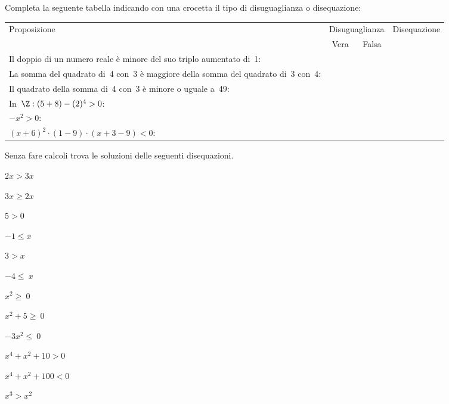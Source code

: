 \begin{esercizio}
 \label{ese:dis_9}
Completa la seguente tabella indicando con una crocetta il tipo di
disuguaglianza o disequazione:

 \begin{tabularx}{.9\textwidth}{X|c|c|c|}
 \toprule
 Proposizione&\multicolumn{2}{c}{Disuguaglianza}& Disequazione\\
  & Vera & Falsa & \\
 \midrule
 Il doppio di un numero reale è minore del suo triplo aumentato di~1: & & & \\
 \midrule
 La somma del quadrato di~4 con~3 è maggiore della somma del quadrato di~3 
con~4: & & &\\
 \midrule
 Il quadrato della somma di~4 con~3 è minore o uguale a~49: & & & \\
 \midrule
 In~\(\Z:(5+8)-(2)^{4}>0\): & & & \\
 \midrule
 \(-x^{2}>0\): & & & \\
 \midrule
 \((x+6)^{2}\cdot (1-9)\cdot (x+3-9)<0\): & & & \\
 \bottomrule
 \end{tabularx}
\end{esercizio}

\begin{esercizio}
 \label{ese:dis_10}
 Senza fare calcoli trova le soluzioni delle seguenti disequazioni.
\begin{htmulticols}{3}
 \begin{enumeratea}
\item \(2x>3x\)
\item \(3x\ge2x\)
\item \(5>0\)
\item \(-1\le x\)
\item \(3>x\)
\item \(-4\le~x\)
\item \(x^2\ge~0\)
\item \(x^2+5\ge~0\)
\item \(-3x^2\le~0\)
\item \(x^{4}+x^{2}+10>0\)
\item \(x^{4}+x^{2}+100<0\)
\item \(x^3>x^2\)
 \end{enumeratea}
\end{htmulticols}
\end{esercizio}

